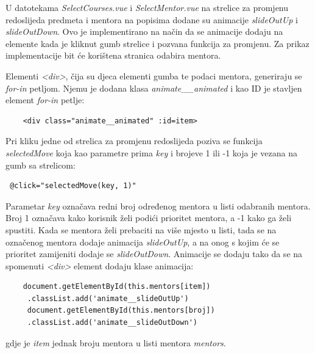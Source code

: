\documentclass[times, utf8, zavrsni, numeric]{fer}
\begin{document}
    U datotekama \textit{SelectCourses.vue} i \textit{SelectMentor.vue} na strelice za promjenu redoslijeda predmeta i mentora na popisima dodane su animacije \textit{slideOutUp} i \textit{slideOutDown}. Ovo je implementirano na način da se animacije dodaju na elemente kada je kliknut gumb strelice i pozvana funkcija za promjenu. Za prikaz implementacije bit će korištena stranica odabira mentora.
    
    Elementi \textit{<div>}, čija su djeca elementi gumba te podaci mentora, generiraju se \textit{for-in} petljom. Njemu je dodana klasa \textit{animate\_\_animated} i kao ID je stavljen element \textit{for-in} petlje:
    \begin{verbatim}
    <div class="animate__animated" :id=item>
    \end{verbatim}
    Pri kliku jedne od strelica za promjenu redoslijeda poziva se funkcija \textit{selectedMove} koja kao parametre prima \textit{key} i brojeve 1 ili -1 koja je vezana na gumb sa strelicom:
    \begin{verbatim} @click="selectedMove(key, 1)" \end{verbatim}
    Parametar \textit{key} označava redni broj određenog mentora u listi odabranih mentora. Broj 1 označava kako korisnik želi podići prioritet mentora, a -1 kako ga želi spustiti. Kada se mentora želi prebaciti na više mjesto u listi, tada se na označenog mentora dodaje animacija \textit{slideOutUp}, a na onog s kojim će se prioritet zamijeniti dodaje se \textit{slideOutDown}. Animacije se dodaju tako da se na spomenuti \textit{<div>} element dodaju klase animacija:
    \begin{verbatim}
    document.getElementById(this.mentors[item])
     .classList.add('animate__slideOutUp')
     document.getElementById(this.mentors[broj])
     .classList.add('animate__slideOutDown')
    \end{verbatim}
    gdje je \textit{item} jednak broju mentora u listi mentora \textit{mentors}.
    
\end{document}
